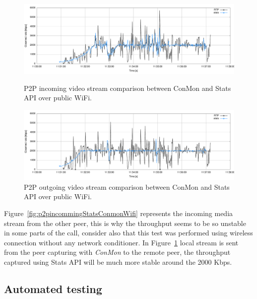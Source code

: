 \begin{figure}[h]
	\begin{minipage}{.5\textwidth}
		\includegraphics[width=1\textwidth]{./figures/p2pincommingStatsConmonWifi.pdf}
			\caption[P2P incoming video stream comparison between ConMon and Stats API over public WiFi]{P2P incoming video stream comparison between ConMon and Stats API over public WiFi.}
			\label{fig:p2pincommingStatsConmonWifi}
	 \end{minipage}
	 \begin{minipage}{.5\textwidth}
		\includegraphics[width=1\textwidth]{./figures/p2poutgoingStatsConmonWifi.pdf}
			\caption[P2P outgoing video stream comparison between ConMon and Stats API over public WiFi]{P2P outgoing video stream comparison between ConMon and Stats API over public WiFi.}
			\label{fig:p2poutgoingStatsConmonWifi}
	 \end{minipage}
\end{figure}

Figure~\ref{fig:p2pincommingStatsConmonWifi} represents the incoming media stream from the other peer, this is why the throughput seems to be so unstable in some parts of the call, consider also that this test was performed using wireless connection without any network conditioner. In Figure~\ref{fig:p2poutgoingStatsConmonWifi} local stream is sent from the peer capturing with {\it ConMon} to the remote peer, the throughput captured using Stats API will be much more stable around the 2000 Kbps.

\subsection{Automated testing}


